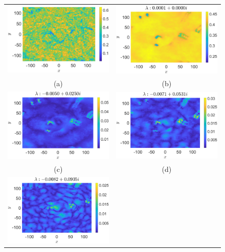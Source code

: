 \documentclass[aps,prl,preprint,groupedaddress]{revtex4-1}
\begin{document}
\begin{figure}[!ht]
\centering
\begin{tabular}{cc}
\includegraphics[width=.51\textwidth]{amplitude_lfforce_K_256_Lx_128_tf_1pt5e4} &\hspace{-15pt} \includegraphics[width=.51\textwidth]{mean_lfforce_K_256_Lx_128_tf_1_pt5e4} \\
(a) & (b)\\
\includegraphics[width=.51\textwidth]{osc1_lfforce_K_256_Lx_128_tf_1_pt5e4} &\hspace{-15pt} \includegraphics[width=.51\textwidth]{osc2_lfforce_K_256_Lx_128_tf_1_pt5e4} \\
(c) & (d)\\
\includegraphics[width=.51\textwidth]{osc3_lfforce_K_256_Lx_128_tf_1_pt5e4} & \\

\end{tabular}
\end{figure}
\end{document}

